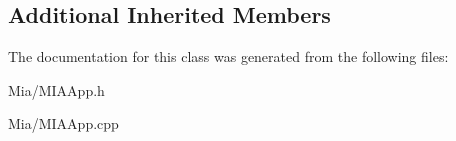 \subsection*{Additional Inherited Members}


The documentation for this class was generated from the following files\-:\begin{DoxyCompactItemize}
\item 
Mia/M\-I\-A\-App.\-h\item 
Mia/M\-I\-A\-App.\-cpp\end{DoxyCompactItemize}
